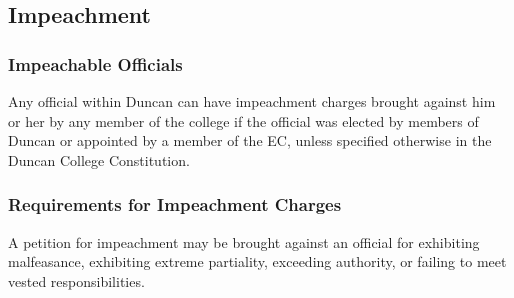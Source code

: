 \documentclass[USletter,12pt]{article}
\begin{document}
\begin{enumerate}[(a)]
\subsection{Impeachment}


\subsubsection{Impeachable Officials}
Any official within Duncan can have impeachment charges brought against him or her by any member of the college if the official was elected by members of Duncan or appointed by a member of the EC, unless specified otherwise in the Duncan College Constitution.

\subsubsection{Requirements for Impeachment Charges}
A petition for impeachment may be brought against an official for exhibiting malfeasance, exhibiting extreme partiality, exceeding authority, or failing to meet vested responsibilities.


\end{enumerate}
\end{document}
